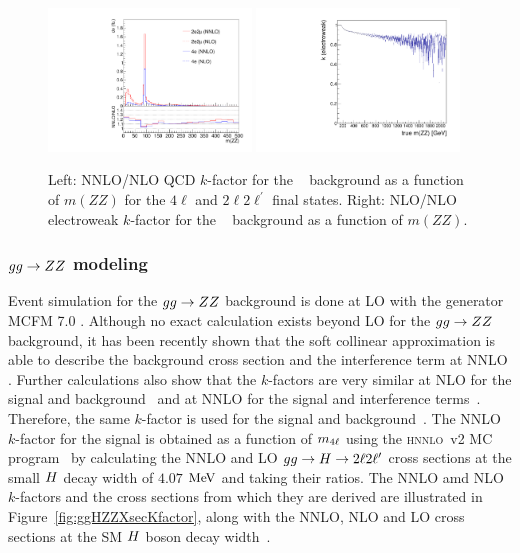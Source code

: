 \begin{figure}[!htb]
\vspace*{0.3cm}
\begin{center}
\includegraphics[width=0.48\textwidth]{Figures/IrrBkg/Kfactor_qqZZ_mZZ.pdf}
\includegraphics[width=0.48\textwidth]{Figures/IrrBkg/K_ewk_qqZZ.pdf} 
\caption{Left: NNLO/NLO QCD $k$-factor for the \qqZZ~ background as a function of $m(ZZ)$ for the $4\ell$ and $2\ell2\ell^{\prime}$ final states. Right: NLO/NLO electroweak $k$-factor for the \qqZZ~ background as a function of $m(ZZ)$.
\label{fig:qqZZKfactor}}
\end{center}
\end{figure}


\subsubsection{$gg\to ZZ$ modeling}

Event simulation for the $gg\to ZZ$ background is done at LO with the generator MCFM 7.0 \cite{MCFM,Campbell:2011bn,Campbell:2013una}.
Although no exact calculation exists beyond LO for the $gg\to ZZ$ background, 
it has been recently shown 
that the soft collinear approximation is able to describe the background cross section and the 
interference term at NNLO \cite{Bonvini:1304.3053}. Further calculations also show that the $k$-factors are very similar at NLO for the signal 
and background~\cite{Melnikov:2015laa} and at NNLO for the signal and interference terms~\cite{Li:2015jva}. Therefore, the same $k$-factor 
is used for the signal and background~\cite{Passarino:1312.2397v1}. The NNLO $k$-factor for the signal is obtained as a function of $m_{4\ell}$ 
using the \textsc{hnnlo}~v2 MC program~\cite{Catani:2007vq,Grazzini:2008tf,Grazzini:2013mca} by calculating the NNLO and LO 
$gg\to H\to2\ell2\ell^\prime$ cross sections at the small $H$ decay width of $4.07$ $\mathrm{Me\kern -0.1em V}$ and taking their ratios. The NNLO amd NLO $k$-factors and the cross sections from which they are derived are illustrated in Figure~\ref{fig:ggHZZXsecKfactor}, 
along with the NNLO, NLO and LO cross sections at the SM $H$ boson decay width~\cite{Heinemeyer:2013tqa}.
 
